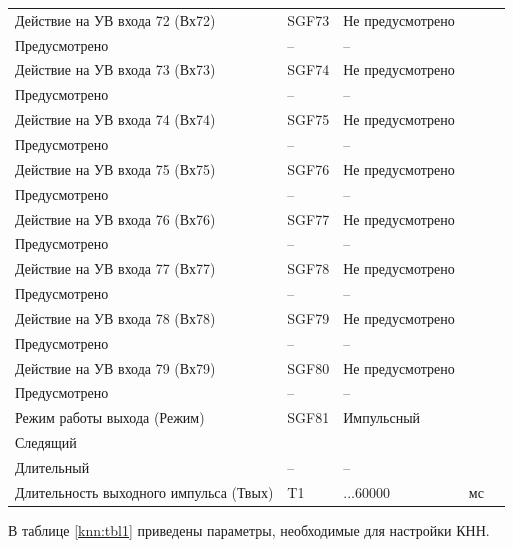 \begin{longtable}{|>{\centering\arraybackslash}m{5.3cm}|>{\centering\arraybackslash}m{3.3cm}|>{\centering\arraybackslash}m{4.2cm}|>{\centering\arraybackslash}m{1.8cm}|>{\centering\arraybackslash}m{1cm}|}
\hline
\centering Действие на УВ входа 72 (Вх72)  & \centering SGF73 & \centering Не предусмотрено \\ Предусмотрено & \centering -- & \centering \arraybackslash -- \\
\hline
\centering Действие на УВ входа 73 (Вх73)  & \centering SGF74 & \centering Не предусмотрено \\ Предусмотрено & \centering -- & \centering \arraybackslash -- \\
\hline
\centering Действие на УВ входа 74 (Вх74)  & \centering SGF75 & \centering Не предусмотрено \\ Предусмотрено & \centering -- & \centering \arraybackslash -- \\
\hline
\centering Действие на УВ входа 75 (Вх75)  & \centering SGF76 & \centering Не предусмотрено \\ Предусмотрено & \centering -- & \centering \arraybackslash -- \\
\hline
\centering Действие на УВ входа 76 (Вх76)  & \centering SGF77 & \centering Не предусмотрено \\ Предусмотрено & \centering -- & \centering \arraybackslash -- \\
\hline
\centering Действие на УВ входа 77 (Вх77)  & \centering SGF78 & \centering Не предусмотрено \\ Предусмотрено & \centering -- & \centering \arraybackslash -- \\
\hline
\centering Действие на УВ входа 78 (Вх78)  & \centering SGF79 & \centering Не предусмотрено \\ Предусмотрено & \centering -- & \centering \arraybackslash -- \\
\hline
\centering Действие на УВ входа 79 (Вх79)  & \centering SGF80 & \centering Не предусмотрено \\ Предусмотрено & \centering -- & \centering \arraybackslash -- \\
\hline
\centering Режим работы выхода (Режим)  & \centering SGF81 & \centering Импульсный \\ Следящий \\ Длительный & \centering -- & \centering \arraybackslash -- \\
\hline
\centering Длительность выходного импульса (Твых)  & \centering T1 & \centering 50...60000 & \centering мс & \centering \arraybackslash 10 \\
\hline
\end{longtable}
\normalsize


\par
В таблице \ref{knn:tbl1} приведены параметры, необходимые для настройки КНН.

